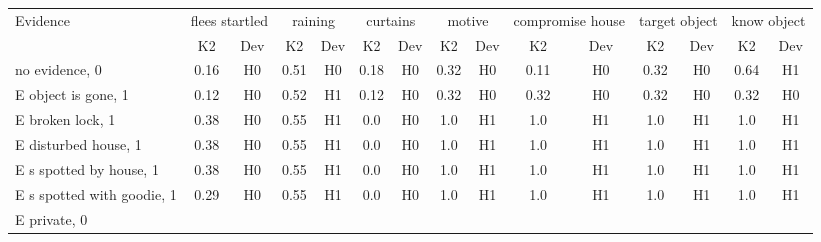 \begin{table}\begin{tabular}{l|cc|cc|cc|cc|cc|cc|cc}\toprule\multirow{2}{*}{Evidence} & \multicolumn{2}{c}{flees startled}& \multicolumn{2}{c}{raining}& \multicolumn{2}{c}{curtains}& \multicolumn{2}{c}{motive}& \multicolumn{2}{c}{compromise house}& \multicolumn{2}{c}{target object}& \multicolumn{2}{c}{know object}\\& {K2} & {Dev}& {K2} & {Dev}& {K2} & {Dev}& {K2} & {Dev}& {K2} & {Dev}& {K2} & {Dev}& {K2} & {Dev}\\\midrule
no evidence, 0 & \cellcolor{Bittersweet}0.16&\cellcolor{Bittersweet}H0&\cellcolor{Bittersweet}0.51&\cellcolor{Bittersweet}H0&\cellcolor{Bittersweet}0.18&\cellcolor{Bittersweet}H0&\cellcolor{Bittersweet}0.32&\cellcolor{Bittersweet}H0&\cellcolor{Bittersweet}0.11&\cellcolor{Bittersweet}H0&\cellcolor{Bittersweet}0.32&\cellcolor{Bittersweet}H0&\cellcolor{Bittersweet}0.64&\cellcolor{Bittersweet}H1\\E object is gone, 1 & \cellcolor{Bittersweet}0.12&\cellcolor{Bittersweet}H0&\cellcolor{Bittersweet}0.52&\cellcolor{Bittersweet}H1&\cellcolor{Bittersweet}0.12&\cellcolor{Bittersweet}H0&\cellcolor{Bittersweet}0.32&\cellcolor{Bittersweet}H0&\cellcolor{Bittersweet}0.32&\cellcolor{Bittersweet}H0&\cellcolor{Bittersweet}0.32&\cellcolor{Bittersweet}H0&\cellcolor{Bittersweet}0.32&\cellcolor{Bittersweet}H0\\E broken lock, 1 & \cellcolor{Bittersweet}0.38&\cellcolor{Bittersweet}H0&\cellcolor{Bittersweet}0.55&\cellcolor{Bittersweet}H1&\cellcolor{Bittersweet}0.0&\cellcolor{Bittersweet}H0&\cellcolor{Bittersweet}1.0&\cellcolor{Bittersweet}H1&\cellcolor{Bittersweet}1.0&\cellcolor{Bittersweet}H1&\cellcolor{Bittersweet}1.0&\cellcolor{Bittersweet}H1&\cellcolor{Bittersweet}1.0&\cellcolor{Bittersweet}H1\\E disturbed house, 1 & \cellcolor{Bittersweet}0.38&\cellcolor{Bittersweet}H0&\cellcolor{Bittersweet}0.55&\cellcolor{Bittersweet}H1&\cellcolor{Bittersweet}0.0&\cellcolor{Bittersweet}H0&\cellcolor{Bittersweet}1.0&\cellcolor{Bittersweet}H1&\cellcolor{Bittersweet}1.0&\cellcolor{Bittersweet}H1&\cellcolor{Bittersweet}1.0&\cellcolor{Bittersweet}H1&\cellcolor{Bittersweet}1.0&\cellcolor{Bittersweet}H1\\E s spotted by house, 1 & \cellcolor{Bittersweet}0.38&\cellcolor{Bittersweet}H0&\cellcolor{Bittersweet}0.55&\cellcolor{Bittersweet}H1&\cellcolor{Bittersweet}0.0&\cellcolor{Bittersweet}H0&\cellcolor{Bittersweet}1.0&\cellcolor{Bittersweet}H1&\cellcolor{Bittersweet}1.0&\cellcolor{Bittersweet}H1&\cellcolor{Bittersweet}1.0&\cellcolor{Bittersweet}H1&\cellcolor{Bittersweet}1.0&\cellcolor{Bittersweet}H1\\E s spotted with goodie, 1 & \cellcolor{Bittersweet}0.29&\cellcolor{Bittersweet}H0&\cellcolor{Bittersweet}0.55&\cellcolor{Bittersweet}H1&\cellcolor{Bittersweet}0.0&\cellcolor{Bittersweet}H0&\cellcolor{Bittersweet}1.0&\cellcolor{Bittersweet}H1&\cellcolor{Bittersweet}1.0&\cellcolor{Bittersweet}H1&\cellcolor{Bittersweet}1.0&\cellcolor{Bittersweet}H1&\cellcolor{Bittersweet}1.0&\cellcolor{Bittersweet}H1\\E private, 0 & 
\end{tabular}
\end{table}
